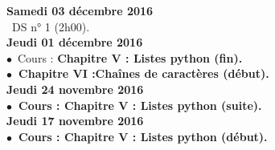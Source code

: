 \documentclass[12pt,a4paper]{article}
\begin{document}
%  
%  
%  
%  
%  
%  

%  

  
\noindent\textbf{\bf Samedi 03 décembre 2016 \rm}\\
\bu\ DS n° 1 (2h00).\vspace{.4cm}\\

\noindent\textbf{\bf Jeudi 01 décembre 2016 \rm}\\
$\bullet$\ Cours : \bf Chapitre V \rm : Listes python (fin).\\
$\bullet$\ \bf Chapitre VI :\rm Chaînes de caractères (début).\vspace{.4cm}\\

\noindent\textbf{\bf Jeudi 24 novembre 2016 \rm}\\
$\bullet$\ Cours : \bf Chapitre V \rm : Listes python (suite).\vspace{.4cm}\\

\noindent\textbf{\bf Jeudi 17 novembre 2016 \rm}\\
$\bullet$\ Cours : \bf Chapitre V \rm : Listes python (début).\vspace{.4cm}\\
\end{document}
